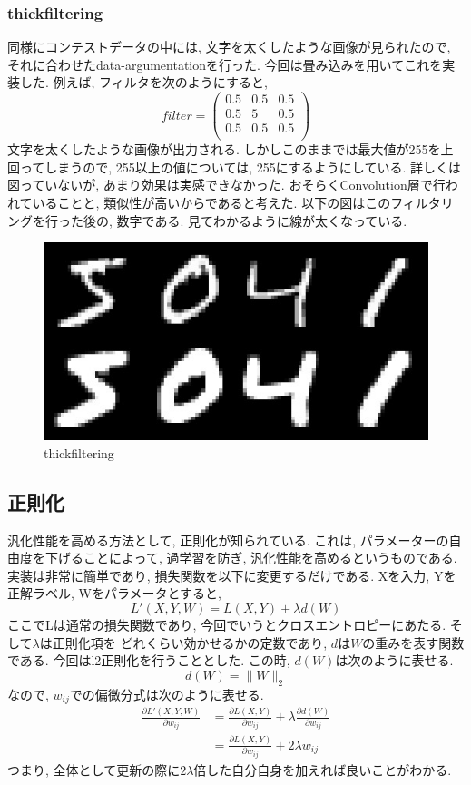 \documentclass[a4paper,11pt]{jsarticle}
\begin{document}
\subsubsection*{thickfiltering}
同様にコンテストデータの中には, 文字を太くしたような画像が見られたので,
それに合わせたdata-argumentationを行った. 今回は畳み込みを用いてこれを実装した.
例えば, フィルタを次のようにすると,
$$
  filter =
  \begin{pmatrix}
    0.5 & 0.5 & 0.5 \\
    0.5 & 5   & 0.5 \\
    0.5 & 0.5 & 0.5 \\
  \end{pmatrix}
$$
文字を太くしたような画像が出力される. しかしこのままでは最大値が255を上回ってしまうので,
255以上の値については, 255にするようにしている. 詳しくは図っていないが,
あまり効果は実感できなかった. おそらくConvolution層で行われていることと,
類似性が高いからであると考えた. 以下の図はこのフィルタリングを行った後の, 数字である.
見てわかるように線が太くなっている.
\begin{figure}[H]
  \centering
  \caption{thickfiltering}
  \includegraphics*[width=0.75\linewidth]{thick_filtering.jpg}
\end{figure}

\subsection{正則化}
汎化性能を高める方法として, 正則化が知られている. これは,
パラメーターの自由度を下げることによって, 過学習を防ぎ,
汎化性能を高めるというものである. 実装は非常に簡単であり,
損失関数を以下に変更するだけである. Xを入力, Yを正解ラベル, Wをパラメータとすると,
$$
  L'(X, Y, W) = L(X, Y) + \lambda d(W)
$$
ここでLは通常の損失関数であり, 今回でいうとクロスエントロピーにあたる. そして$\lambda$は正則化項を
どれくらい効かせるかの定数であり, $d$は$W$の重みを表す関数である.
今回はl2正則化を行うこととした. この時, $d(W)$は次のように表せる.
$$
  d(W) = \| W \|_{2}
$$
なので, $w_{ij}$での偏微分式は次のように表せる.
\begin{align*}
  \frac{\partial L'(X, Y, W)}{\partial w_{ij}} & = \frac{\partial L(X, Y)}{\partial w_{ij}} + \lambda \frac{\partial d(W)}{\partial w_{ij}} \\
                                               & = \frac{\partial L(X, Y)}{\partial w_{ij}} + 2\lambda w_{ij}
\end{align*}
つまり, 全体として更新の際に$2\lambda$倍した自分自身を加えれば良いことがわかる.
\end{document}
